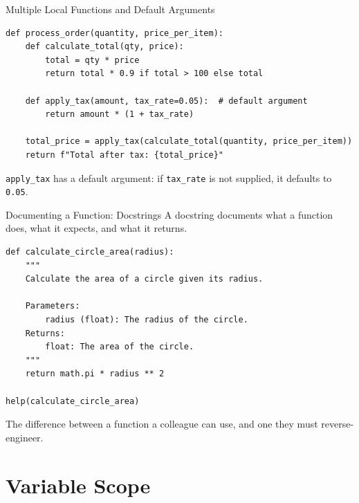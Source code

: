 \documentclass[9pt,aspectratio=169,xcolor=table]{beamer}
\begin{document}
\begin{frame}[fragile]{Multiple Local Functions and Default Arguments}
    \leavevmode
\begin{lstlisting}
def process_order(quantity, price_per_item):
    def calculate_total(qty, price):
        total = qty * price
        return total * 0.9 if total > 100 else total

    def apply_tax(amount, tax_rate=0.05):  # default argument
        return amount * (1 + tax_rate)

    total_price = apply_tax(calculate_total(quantity, price_per_item))
    return f"Total after tax: {total_price}"
\end{lstlisting}

    \vspace{1mm}
    {\small \texttt{apply\_tax} has a \alert{default argument}: if
    \texttt{tax\_rate} is not supplied, it defaults to \texttt{0.05}.}
\end{frame}

\begin{frame}[fragile]{Documenting a Function: Docstrings}
    \leavevmode
    A \alert{docstring} documents what a function does, what it expects,
    and what it returns.

\begin{lstlisting}
def calculate_circle_area(radius):
    """
    Calculate the area of a circle given its radius.

    Parameters:
        radius (float): The radius of the circle.
    Returns:
        float: The area of the circle.
    """
    return math.pi * radius ** 2

help(calculate_circle_area)
\end{lstlisting}

    \vspace{1mm}
    {\small The difference between a function a colleague can use, and
    one they must reverse-engineer.}
\end{frame}

\section{Variable Scope}
\end{document}
